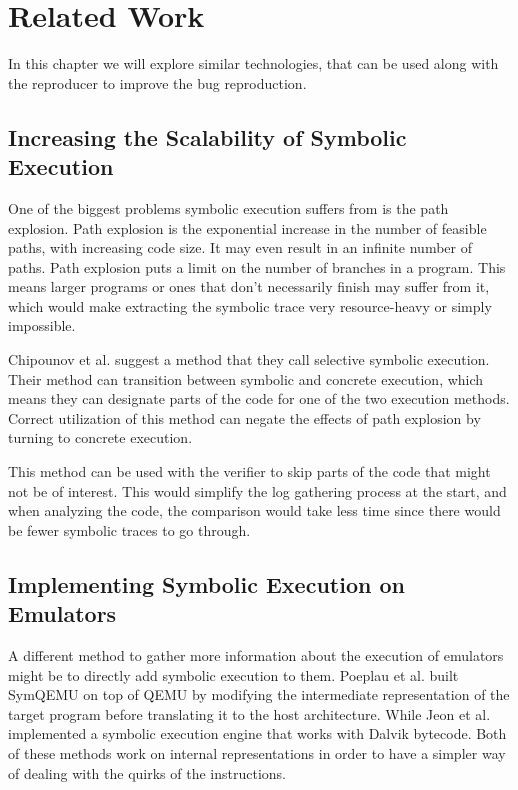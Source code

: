 
\chapter{Related Work}\label{chapter:related_work}
In this chapter we will explore similar technologies, that can be used along with the reproducer to improve the bug reproduction.

\section{Increasing the Scalability of Symbolic Execution}
One of the biggest problems symbolic execution suffers from is the path explosion.
Path explosion is the exponential increase in the number of feasible paths, with increasing code size.
It may even result in an infinite number of paths.
Path explosion puts a limit on the number of branches in a program.
This means larger programs or ones that don't necessarily finish may suffer from it, which would make extracting the symbolic trace very resource-heavy or simply impossible.

Chipounov et al. \cite{chipounov2009selective} suggest a method that they call selective symbolic execution.
Their method can transition between symbolic and concrete execution, which means they can designate parts of the code for one of the two execution methods.
Correct utilization of this method can negate the effects of path explosion by turning to concrete execution.

This method can be used with the verifier to skip parts of the code that might not be of interest.
This would simplify the log gathering process at the start, and when analyzing the code, the comparison would take less time since there would be fewer symbolic traces to go through.

\section{Implementing Symbolic Execution on Emulators}
A different method to gather more information about the execution of emulators might be to directly add symbolic execution to them.
Poeplau et al. \cite{poeplau2021symqemu} built SymQEMU on top of QEMU by modifying the intermediate representation of the target program before translating it to the host architecture.
While Jeon et al. \cite{jeon2012symdroid} implemented a symbolic execution engine that works with Dalvik bytecode.
Both of these methods work on internal representations in order to have a simpler way of dealing with the quirks of the instructions.


